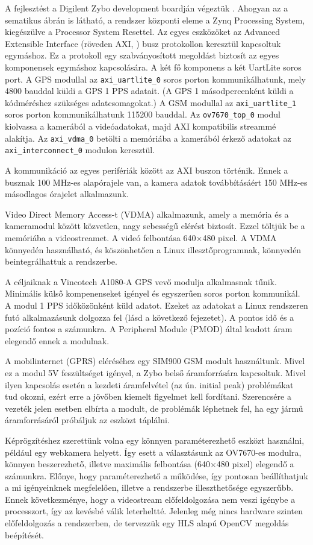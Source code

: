 \documentclass[a4paper,12pt]{report}
\begin{document}
A fejlesztést a Digilent Zybo development boardján végeztük \cite{zybo}. Ahogyan az a sematikus ábrán is látható, a rendszer központi eleme a Zynq Processing System, kiegészülve a Processor System Resettel. Az egyes eszközöket az Advanced Extensible Interface (röveden AXI, \cite{xilinx1999reference}) busz protokollon keresztül kapcsoltuk egymáshoz. Ez a protokoll egy szabványosított megoldást biztosít az egyes komponensek egymáshoz kapcsolására. A két fő komponens a két UartLite soros port. A GPS modullal az \texttt{axi\_uartlite\_0} soros porton kommunikálhatunk, mely 4800 bauddal küldi a GPS 1 PPS adatait. (A GPS 1 másodpercenként küldi a kódméréshez szükséges adatcsomagokat.) A GSM modullal az \texttt{axi\_uartlite\_1} soros porton kommunikálhatunk 115200 bauddal. Az \texttt{ov7670\_top\_0} modul kiolvassa a kamerából a videóadatokat, majd AXI kompatibilis streammé alakítja. Az \texttt{axi\_vdma\_0} betölti a memóriába a kamerából érkező adatokat az \texttt{axi\_interconnect\_0} modulon keresztül.

A kommunikáció az egyes perifériák között az AXI buszon történik. Ennek a busznak 100 MHz-es alapórajele van, a kamera adatok továbbításáért 150 MHz-es másodlagos órajelet alkalmazunk.

Video Direct Memory Access-t (VDMA) alkalmazunk, amely a memória és a kameramodul között közvetlen, nagy sebességű elérést biztosít. Ezzel töltjük be a memóriába a videostreamet. A videó felbontása 640$\times$480 pixel. A VDMA könnyedén használható, és köszönhetően a Linux illesztőprogramnak, könnyedén beintegrálhattuk a rendszerbe.

A céljaiknak a Vincotech A1080-A GPS vevő modulja alkalmasnak tűnik. Minimális külső kompenenseket igényel és egyszerűen soros porton kommunikál. A modul 1 PPS időközönként küld adatot. Ezeket az adatokat a Linux rendszeren futó alkalmazásunk dolgozza fel (lásd a következő fejezetet). A pontos idő és a pozíció fontos a számunkra. A Peripheral Module (PMOD) által leadott áram elegendő ennek a modulnak.

A mobilinternet (GPRS) eléréséhez egy SIM900 GSM modult használtunk. Mivel ez a modul 5V feszültséget igényel, a Zybo belső áramforrására kapcsoltuk. Mivel ilyen kapcsolás esetén a kezdeti áramfelvétel (az ún. initial peak) problémákat tud okozni, ezért erre a jövőben kiemelt figyelmet kell fordítani. Szerencsére a vezeték jelen esetben elbírta a modult, de problémák léphetnek fel, ha egy jármű áramforrásáról próbáljuk az eszközt táplálni.

Képrögzítéshez szerettünk volna egy könnyen paraméterezhető eszközt használni, például egy webkamera helyett. Így esett a választásunk az OV7670-es modulra, könnyen beszerezhető, illetve maximális felbontása (640$\times$480 pixel) elegendő a számunkra. Előnye, hogy paraméterezhető a működése, így pontosan beállíthatjuk a mi igényeinknek megfelelően, illetve a rendszerbe illeszthetősége egyszerűbb. Ennek következménye, hogy a videostream előfeldolgozása nem veszi igénybe a processzort, így az kevésbé válik leterheltté. Jelenleg még nincs hardware szinten előfeldolgozás a rendszerben, de tervezzük egy HLS alapú OpenCV megoldás beépítését.
\end{document}
